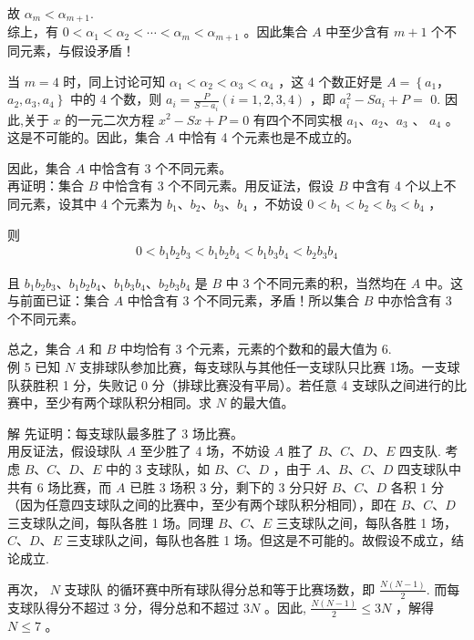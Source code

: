 \documentclass[10pt]{article}
\begin{document}
故 $\alpha_{m}<\alpha_{m+1}$.\\
综上，有 $0<\alpha_{1}<\alpha_{2}<\cdots<\alpha_{m}<\alpha_{m+1}$ 。因此集合 $A$ 中至少含有 $m+1$ 个不同元素，与假设矛盾！

当 $m=4$ 时，同上讨论可知 $\alpha_{1}<\alpha_{2}<\alpha_{3}<\alpha_{4}$ ，这 4 个数正好是 $A=\left\{a_{1} ，\right.$ $\left.a_{2}, a_{3}, a_{4}\right\}$ 中的 4 个数，则 $a_{i}=\frac{P}{S-a_{i}}(i=1,2,3,4)$ ，即 $a_{i}^{2}-S a_{i}+P=$ 0. 因此,关于 $x$ 的一元二次方程 $x^{2}-S x+P=0$ 有四个不同实根 $a_{1} 、 a_{2} 、 a_{3}$ 、 $a_{4}$ 。这是不可能的。因此，集合 $A$ 中恰有 4 个元素也是不成立的。

因此，集合 $A$ 中恰含有 3 个不同元素。\\
再证明：集合 $B$ 中恰含有 3 个不同元素。用反证法，假设 $B$ 中含有 4 个以上不同元素，设其中 4 个元素为 $b_{1} 、 b_{2} 、 b_{3} 、 b_{4}$ ，不妨设 $0<b_{1}<b_{2}<b_{3}<b_{4}$ ，

则\\
\begin{align*}
0<b_{1} b_{2} b_{3}<b_{1} b_{2} b_{4}<b_{1} b_{3} b_{4}<b_{2} b_{3} b_{4}
\end{align*}

且 $b_{1} b_{2} b_{3} 、 b_{1} b_{2} b_{4} 、 b_{1} b_{3} b_{4} 、 b_{2} b_{3} b_{4}$ 是 $B$ 中 3 个不同元素的积，当然均在 $A$ 中。这与前面已证：集合 $A$ 中恰含有 3 个不同元素，矛盾！所以集合 $B$ 中亦恰含有 3 个不同元素。

总之，集合 $A$ 和 $B$ 中均恰有 3 个元素，元素的个数和的最大值为 6.\\
例 5 已知 $N$ 支排球队参加比赛，每支球队与其他任一支球队只比赛 1场。一支球队获胜积 1 分，失败记 0 分（排球比赛没有平局）。若任意 4 支球队之间进行的比赛中，至少有两个球队积分相同。求 $N$ 的最大值。

解 先证明：每支球队最多胜了 3 场比赛。\\
用反证法，假设球队 $A$ 至少胜了 4 场，不妨设 $A$ 胜了 $B 、 C 、 D 、 E$ 四支队. 考虑 $B 、 C 、 D 、 E$ 中的 3 支球队，如 $B 、 C 、 D$ ，由于 $A 、 B 、 C 、 D$ 四支球队中共有 6 场比赛，而 $A$ 已胜 3 场积 3 分，剩下的 3 分只好 $B 、 C 、 D$ 各积 1 分 （因为任意四支球队之间的比赛中，至少有两个球队积分相同），即在 $B 、 C 、 D$三支球队之间，每队各胜 1 场。同理 $B 、 C 、 E$ 三支球队之间，每队各胜 1 场， $C 、 D 、 E$ 三支球队之间，每队也各胜 1 场。但这是不可能的。故假设不成立，结论成立.

再次， $N$ 支球队 的循环赛中所有球队得分总和等于比赛场数，即 $\frac{N(N-1)}{2}$. 而每支球队得分不超过 3 分，得分总和不超过 $3 N$ 。因此, $\frac{N(N-1)}{2} \leqslant 3 N$ ，解得 $N \leqslant 7$ 。
\end{document}
